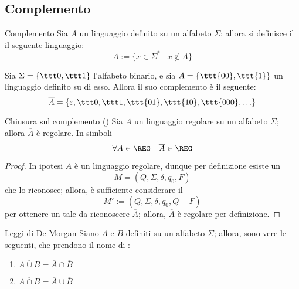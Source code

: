 \documentclass[a4paper, 12pt]{report}
\begin{document}
    \subsection{Complemento}

    \begin{frameddefn}{Complemento}
        Sia $A$ un linguaggio definito su un alfabeto $\Sigma$; allora si definisce il  il seguente linguaggio: $$\overline A := \{x \in \Sigma^* \mid x \notin A\}$$
    \end{frameddefn}

    \begin{example}[Complemento]
        Sia $\Sigma = \{\ttt 0, \ttt 1\}$ l'alfabeto binario, e sia $A = \{ \ttt{00}, \ttt{1}\}$ un linguaggio definito su di esso. Allora il suo complemento è il seguente: $$\overline A = \{\varepsilon, \ttt 0, \ttt 1, \ttt{01}, \ttt{10}, \ttt{000}, \ldots\}$$
    \end{example}

    \begin{framedprop}[label={closure compl}]{Chiusura sul complemento (\REG)}
        Sia $A$ un linguaggio regolare su un alfabeto $\Sigma$; allora $\overline A$ è regolare. In simboli $$\forall A \in \REG \quad \overline A \in \REG$$
    \end{framedprop}

    \begin{proof}
        In ipotesi $A$ è un linguaggio regolare, dunque per definizione esiste un \DFA $$M = (Q, \Sigma, \delta, q_0, F)$$ che lo riconosce; allora, è sufficiente considerare il \DFA $$M' := (Q, \Sigma, \delta, q_0, Q-F)$$ per ottenere un \DFA tale da riconoscere $\overline A$; allora, $\overline A$ è regolare per definizione.
    \end{proof}

    \begin{framedprop}{Leggi di De Morgan}
        Siano $A$ e $B$ definiti su un alfabeto $\Sigma$; allora, sono vere le seguenti, che prendono il nome di :

        \begin{enumerate}[label=\roman*), font=\itshape]
            \item $\overline{A \cup B} = \overline A \cap \overline B$
            \item $\overline{A \cap B} = \overline A \cup \overline B$
        \end{enumerate}
    \end{framedprop}
\end{document}
